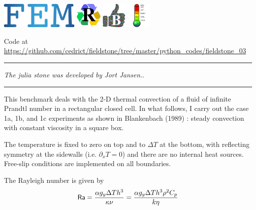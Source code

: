 \includegraphics[height=1.25cm]{images/pictograms/FEM}
\includegraphics[height=1.25cm]{images/pictograms/replication}
\includegraphics[height=1.25cm]{images/pictograms/benchmark}
\includegraphics[height=1.25cm]{images/pictograms/temperature}



Code at \url{https://github.com/cedrict/fieldstone/tree/master/python_codes/fieldstone_03}

\par\noindent\rule{\textwidth}{0.4pt}

{\sl The julia stone was developed by Jort Jansen.}. 

\par\noindent\rule{\textwidth}{0.4pt}

This benchmark deals with the 2-D thermal convection of a fluid 
of infinite Prandtl number in a rectangular closed cell.
In what follows, I carry out the case 1a, 1b, and 1c experiments as shown in 
Blankenbach \etal (1989) \cite{blbc89}:
steady convection with constant viscosity in a square box.

The temperature is fixed to zero on top and to $\Delta T$ at the bottom, 
with reflecting symmetry at the sidewalls (i.e. $\partial_x T=0$) 
and there are no internal heat sources. 
Free-slip conditions are implemented on all boundaries. 

The Rayleigh number is given by
\begin{equation}
{\mathsf{Ra}} = \frac{\alpha g_y \Delta T h^3 }{\kappa \nu}
=\frac{\alpha g_y \Delta T h^3 \rho^2 C_p}{k \eta}
\end{equation}

